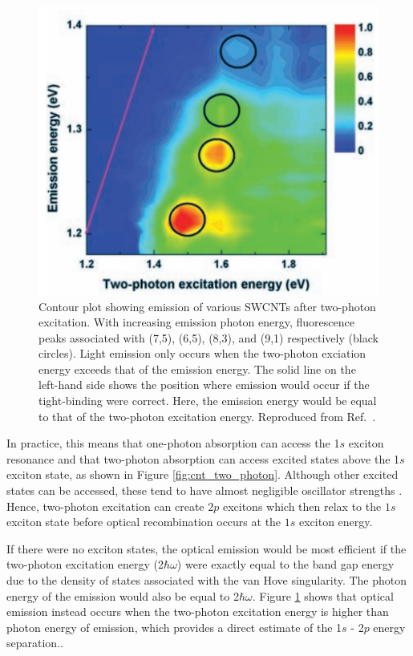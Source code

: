 \begin{figure}[ht]
	\centering
	\includegraphics[scale=0.3]{images/chapter_optical_props/two_photon_wang}
	\caption{Contour plot showing emission of various SWCNTs after two-photon excitation. With increasing emission photon energy, fluorescence peaks associated with (7,5), (6,5), (8,3), and (9,1) respectively (black circles). Light emission only occurs when the two-photon exciation energy exceeds that of the emission energy. The solid line on the left-hand side shows the position where emission would occur if the tight-binding were correct. Here, the emission energy would be equal to that of the two-photon excitation energy. Reproduced from Ref.\ \cite{wang2005optical}.}
	\label{fig:cnt_two_photon_emission}
\end{figure}

In practice, this means that one-photon absorption can access the 1$s$ exciton resonance and that two-photon absorption can access excited states above the 1$s$ exciton state, as shown in Figure \ref{fig:cnt_two_photon}. Although other excited states can be accessed, these tend to have almost negligible oscillator strengths \cite{wang2005optical}. Hence, two-photon excitation can create $2p$ excitons which then relax to the $1s$ exciton state before optical recombination occurs at the $1s$ exciton energy.

If there were no exciton states, the optical emission would be most efficient if the two-photon excitation energy (2$\hbar \omega$) were exactly equal to the band gap energy due to the density of states associated with the van Hove singularity. The photon energy of the emission would also be equal to 2$\hbar \omega$. Figure \ref{fig:cnt_two_photon_emission} shows that optical emission instead occurs when the two-photon excitation energy is higher than photon energy of emission, which provides a direct estimate of the 1$s$ - 2$p$ energy separation..

